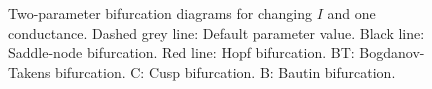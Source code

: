 \documentclass[12pt,a4paper,]{report}
\begin{document}
\begin{figure}
\centering
\captionsetup[subfigure]{labelformat=empty}
\\
\\
\caption[Two-parameter bifurcation diagrams for changing $I$ and one
conductance]{Two-parameter bifurcation diagrams for changing $I$ and one
conductance. Dashed grey line: Default parameter value. Black line:
Saddle-node bifurcation. Red line: Hopf bifurcation. BT: Bogdanov-Takens
bifurcation. C: Cusp bifurcation. B: Bautin
bifurcation.}\label{two-par-cont-plots}
\end{figure}
\end{document}
